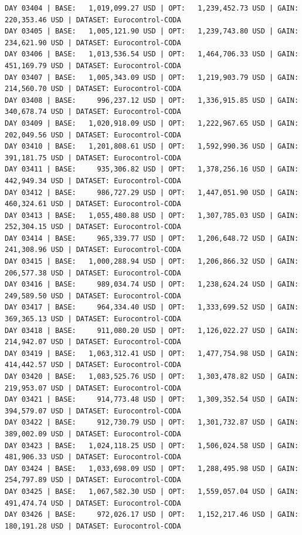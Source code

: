 \documentclass[11pt,a4paper]{article}
\begin{document}
\begin{verbatim}
DAY 03404 | BASE:   1,019,099.27 USD | OPT:   1,239,452.73 USD | GAIN: 220,353.46 USD | DATASET: Eurocontrol-CODA
DAY 03405 | BASE:   1,005,121.90 USD | OPT:   1,239,743.80 USD | GAIN: 234,621.90 USD | DATASET: Eurocontrol-CODA
DAY 03406 | BASE:   1,013,536.54 USD | OPT:   1,464,706.33 USD | GAIN: 451,169.79 USD | DATASET: Eurocontrol-CODA
DAY 03407 | BASE:   1,005,343.09 USD | OPT:   1,219,903.79 USD | GAIN: 214,560.70 USD | DATASET: Eurocontrol-CODA
DAY 03408 | BASE:     996,237.12 USD | OPT:   1,336,915.85 USD | GAIN: 340,678.74 USD | DATASET: Eurocontrol-CODA
DAY 03409 | BASE:   1,020,918.09 USD | OPT:   1,222,967.65 USD | GAIN: 202,049.56 USD | DATASET: Eurocontrol-CODA
DAY 03410 | BASE:   1,201,808.61 USD | OPT:   1,592,990.36 USD | GAIN: 391,181.75 USD | DATASET: Eurocontrol-CODA
DAY 03411 | BASE:     935,306.82 USD | OPT:   1,378,256.16 USD | GAIN: 442,949.34 USD | DATASET: Eurocontrol-CODA
DAY 03412 | BASE:     986,727.29 USD | OPT:   1,447,051.90 USD | GAIN: 460,324.61 USD | DATASET: Eurocontrol-CODA
DAY 03413 | BASE:   1,055,480.88 USD | OPT:   1,307,785.03 USD | GAIN: 252,304.15 USD | DATASET: Eurocontrol-CODA
DAY 03414 | BASE:     965,339.77 USD | OPT:   1,206,648.72 USD | GAIN: 241,308.96 USD | DATASET: Eurocontrol-CODA
DAY 03415 | BASE:   1,000,288.94 USD | OPT:   1,206,866.32 USD | GAIN: 206,577.38 USD | DATASET: Eurocontrol-CODA
DAY 03416 | BASE:     989,034.74 USD | OPT:   1,238,624.24 USD | GAIN: 249,589.50 USD | DATASET: Eurocontrol-CODA
DAY 03417 | BASE:     964,334.40 USD | OPT:   1,333,699.52 USD | GAIN: 369,365.13 USD | DATASET: Eurocontrol-CODA
DAY 03418 | BASE:     911,080.20 USD | OPT:   1,126,022.27 USD | GAIN: 214,942.07 USD | DATASET: Eurocontrol-CODA
DAY 03419 | BASE:   1,063,312.41 USD | OPT:   1,477,754.98 USD | GAIN: 414,442.57 USD | DATASET: Eurocontrol-CODA
DAY 03420 | BASE:   1,083,525.76 USD | OPT:   1,303,478.82 USD | GAIN: 219,953.07 USD | DATASET: Eurocontrol-CODA
DAY 03421 | BASE:     914,773.48 USD | OPT:   1,309,352.54 USD | GAIN: 394,579.07 USD | DATASET: Eurocontrol-CODA
DAY 03422 | BASE:     912,730.79 USD | OPT:   1,301,732.87 USD | GAIN: 389,002.09 USD | DATASET: Eurocontrol-CODA
DAY 03423 | BASE:   1,024,118.25 USD | OPT:   1,506,024.58 USD | GAIN: 481,906.33 USD | DATASET: Eurocontrol-CODA
DAY 03424 | BASE:   1,033,698.09 USD | OPT:   1,288,495.98 USD | GAIN: 254,797.89 USD | DATASET: Eurocontrol-CODA
DAY 03425 | BASE:   1,067,582.30 USD | OPT:   1,559,057.04 USD | GAIN: 491,474.74 USD | DATASET: Eurocontrol-CODA
DAY 03426 | BASE:     972,026.17 USD | OPT:   1,152,217.46 USD | GAIN: 180,191.28 USD | DATASET: Eurocontrol-CODA

\end{verbatim}
\end{document}
